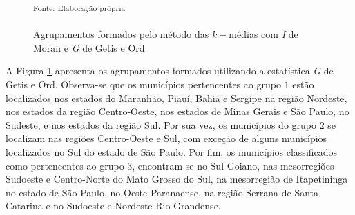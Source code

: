 \documentclass[
	12pt,				%
	openright,			%
	oneside,			%
	a4paper,			%
	chapter=TITLE,		%
	section=TITLE,		%
	english,			%
	french,				%
	spanish,			%
	brazil				%
	]{abntex2}
\begin{document}
\begin{figure}[h!]
	\caption{Agrupamentos formados pelo método das $k-$médias com \textit{I} de Moran e \textit{G} de Getis e Ord}\label{cluster_kmedia}
	\begin{center}
	\end{center}
	\noindent \small \textsuperscript{Fonte: Elaboração própria}
\end{figure}

A Figura \ref{cluster_kmedia} apresenta os agrupamentos formados utilizando a estatística \textit{G} de Getis e Ord. Observa-se que os municípios pertencentes ao grupo $1$ estão localizados nos estados do Maranhão, Piauí, Bahia e Sergipe na região Nordeste, nos estados da região Centro-Oeste, nos estados de Minas Gerais e São Paulo, no Sudeste, e nos estados da região Sul. Por sua vez, os municípios do grupo $2$ se localizam nas regiões Centro-Oeste e Sul, com exceção de alguns municípios localizados no Sul do estado de São Paulo. Por fim, os municípios classificados como pertencentes ao grupo $3$, encontram-se no Sul Goiano, nas mesorregiões Sudoeste e Centro-Norte do Mato Grosso do Sul, na mesorregião de Itapetininga no estado de São Paulo, no Oeste Paranaense, na região Serrana de Santa Catarina e no Sudoeste e Nordeste Rio-Grandense.
\end{document}
